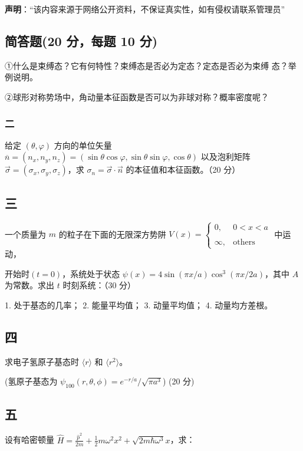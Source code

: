 
\textbf{声明}：“该内容来源于网络公开资料，不保证真实性，如有侵权请联系管理员”

\subsection{简答题(20 分，每题 10 分)}
①什么是束缚态？它有何特性？束缚态是否必为定态？定态是否必为束缚
态？举例说明。

②球形对称势场中，角动量本征函数是否可以为非球对称？概率密度呢？

\subsubsection{二}
 给定 $\left( \theta, \varphi \right)$ 方向的单位矢量 $\overline{n} = \left( n_x, n_y, n_z \right) = \left( \sin \theta \cos \varphi, \sin \theta \sin \varphi, \cos \theta \right)$ 以及泡利矩阵 $\vec{\sigma} = \left( \sigma_x, \sigma_y, \sigma_z \right)$，求 $\sigma_n = \vec{\sigma} \cdot \vec{n}$ 的本征值和本征函数。（20 分）

\subsection{三}
一个质量为 $m$ 的粒子在下面的无限深方势阱 $V(x) = 
\begin{cases} 
0, & 0 < x < a \\\\ 
\infty, & \text{others} 
\end{cases}$ 中运动，

开始时$(t=0)$，系统处于状态 $\psi(x) = 4\sin(\pi x/a)\cos^3(\pi x/2a)$，其中 $A$ 为常数。求出 $t$ 时刻系统：（30 分）

1. 处于基态的几率；
2. 能量平均值；
3. 动量平均值；
4. 动量均方差根。

\subsection{四}
求电子氢原子基态时 $\langle r \rangle$ 和 $ \langle r^2 \rangle$。

(氢原子基态为 $\psi_{100}(r, \theta, \phi) = e^{-r/a}/{\sqrt{\pi a^3}} $) (20 分)

\subsection{五}
设有哈密顿量 $\hat H = \frac{\hat p^2}{2m} + \frac{1}{2}m\omega^2 x^2 + \sqrt{2m\hbar\omega^3} x$，求：

